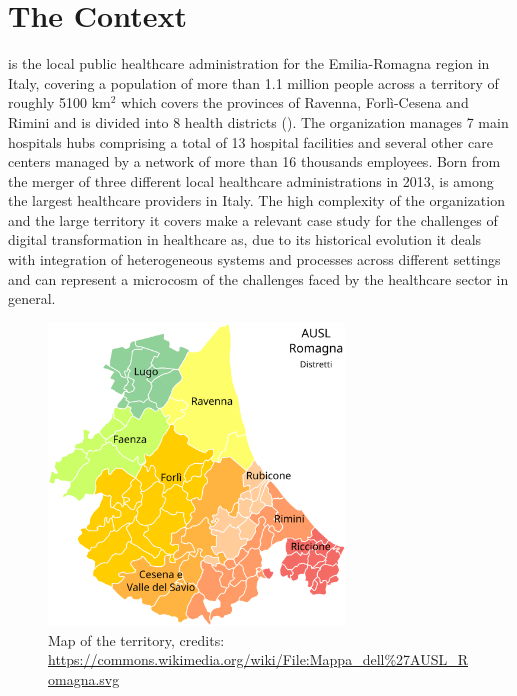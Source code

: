 \section{The \ausl{} Context}

\auslLong{} is the local public healthcare administration for the Emilia-Romagna region in Italy, covering a population of more than 1.1 million people across a territory of roughly 5100 km$^2$ which covers the provinces of Ravenna, Forlì-Cesena and Rimini and is divided into 8 health districts ().
%
The organization manages 7 main hospitals hubs comprising a total of 13 hospital facilities and several other care centers managed by a network of more than 16 thousands employees. 
%
Born from the merger of three different local healthcare administrations in 2013, \ausl{} is among the largest healthcare providers in Italy.
%
The high complexity of the organization and the large territory it covers make \ausl{} a relevant case study for the challenges of digital transformation in healthcare as, due to its historical evolution it deals with integration of heterogeneous systems and processes across different settings and can represent a microcosm of the challenges faced by the healthcare sector in general.


\begin{figure}[t]
    \centering
    \includegraphics[width=0.7\textwidth]{figures/mappa_ausl.png} 
    \caption{
        Map of the \ausl{} territory, credits:
        \url{https://commons.wikimedia.org/wiki/File:Mappa_dell\%27AUSL_Romagna.svg}
    }
    \label{fig:ausl-map}
\end{figure}

